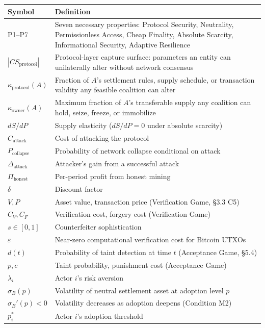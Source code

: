 \documentclass[12pt]{article}
\theoremstyle{definition}
\theoremstyle{remark}
\begin{document}
\begin{table}[h]
\centering
\begin{tabularx}{\textwidth}{lX}
\toprule
Symbol & Definition \\
\midrule
P1--P7 & Seven necessary properties: Protocol Security, Neutrality, Permissionless Access, Cheap Finality, Absolute Scarcity, Informational Security, Adaptive Resilience \\
$|CS_\text{protocol}|$ & Protocol-layer capture surface: parameters an entity can unilaterally alter without network consensus \\
$\kappa_\text{protocol}(A)$ & Fraction of $A$'s settlement rules, supply schedule, or transaction validity any feasible coalition can alter \\
$\kappa_\text{owner}(A)$ & Maximum fraction of $A$'s transferable supply any coalition can hold, seize, freeze, or immobilize \\
$dS/dP$ & Supply elasticity ($dS/dP = 0$ under absolute scarcity) \\
$C_\text{attack}$ & Cost of attacking the protocol \\
$P_\text{collapse}$ & Probability of network collapse conditional on attack \\
$\Delta_\text{attack}$ & Attacker's gain from a successful attack \\
$\Pi_\text{honest}$ & Per-period profit from honest mining \\
$\delta$ & Discount factor \\
$V, P$ & Asset value, transaction price (Verification Game, \S3.3 C5) \\
$C_V, C_F$ & Verification cost, forgery cost (Verification Game) \\
$s \in [0, 1]$ & Counterfeiter sophistication \\
$\varepsilon$ & Near-zero computational verification cost for Bitcoin UTXOs \\
$d(t)$ & Probability of taint detection at time $t$ (Acceptance Game, \S5.4) \\
$p, c$ & Taint probability, punishment cost (Acceptance Game) \\
$\lambda_i$ & Actor $i$'s risk aversion \\
$\sigma_B(p)$ & Volatility of neutral settlement asset at adoption level $p$ \\
$\sigma_B'(p) < 0$ & Volatility decreases as adoption deepens (Condition M2) \\
$p_i^*$ & Actor $i$'s adoption threshold \\
\bottomrule
\end{tabularx}
\end{table}
\end{document}
